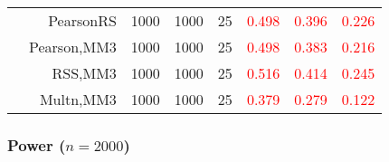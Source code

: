 \documentclass[
]{article}
\begin{document}
\begin{table}[H]
{\begin{tabular}[t]{lrrrrrrr}
\hspace{1em} & PearsonRS & 1000 & 1000 & 25 & \textcolor{red}{0.498} & \textcolor{red}{0.396} & \textcolor{red}{0.226}\\

\hspace{1em} & Pearson,MM3 & 1000 & 1000 & 25 & \textcolor{red}{0.498} & \textcolor{red}{0.383} & \textcolor{red}{0.216}\\

\hspace{1em} & RSS,MM3 & 1000 & 1000 & 25 & \textcolor{red}{0.516} & \textcolor{red}{0.414} & \textcolor{red}{0.245}\\

\hspace{1em} & Multn,MM3 & 1000 & 1000 & 25 & \textcolor{red}{0.379} & \textcolor{red}{0.279} & \textcolor{red}{0.122}\\
\bottomrule
\end{tabular}}
\endgroup{}
\end{table}

\hypertarget{power-n2000}{%
\subsubsection{\texorpdfstring{Power
(\(n=2000\))}{Power (n=2000)}}\label{power-n2000}}
\end{document}
